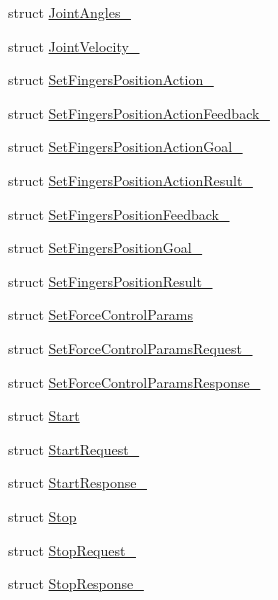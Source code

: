 \begin{DoxyCompactItemize}
struct \hyperlink{structjaco__msgs_1_1JointAngles__}{Joint\+Angles\+\_\+}
\item 
struct \hyperlink{structjaco__msgs_1_1JointVelocity__}{Joint\+Velocity\+\_\+}
\item 
struct \hyperlink{structjaco__msgs_1_1SetFingersPositionAction__}{Set\+Fingers\+Position\+Action\+\_\+}
\item 
struct \hyperlink{structjaco__msgs_1_1SetFingersPositionActionFeedback__}{Set\+Fingers\+Position\+Action\+Feedback\+\_\+}
\item 
struct \hyperlink{structjaco__msgs_1_1SetFingersPositionActionGoal__}{Set\+Fingers\+Position\+Action\+Goal\+\_\+}
\item 
struct \hyperlink{structjaco__msgs_1_1SetFingersPositionActionResult__}{Set\+Fingers\+Position\+Action\+Result\+\_\+}
\item 
struct \hyperlink{structjaco__msgs_1_1SetFingersPositionFeedback__}{Set\+Fingers\+Position\+Feedback\+\_\+}
\item 
struct \hyperlink{structjaco__msgs_1_1SetFingersPositionGoal__}{Set\+Fingers\+Position\+Goal\+\_\+}
\item 
struct \hyperlink{structjaco__msgs_1_1SetFingersPositionResult__}{Set\+Fingers\+Position\+Result\+\_\+}
\item 
struct \hyperlink{namespacejaco__msgs_df/d4f/structjaco__msgs_1_1SetForceControlParams}{Set\+Force\+Control\+Params}
\item 
struct \hyperlink{structjaco__msgs_1_1SetForceControlParamsRequest__}{Set\+Force\+Control\+Params\+Request\+\_\+}
\item 
struct \hyperlink{structjaco__msgs_1_1SetForceControlParamsResponse__}{Set\+Force\+Control\+Params\+Response\+\_\+}
\item 
struct \hyperlink{namespacejaco__msgs_d8/d46/structjaco__msgs_1_1Start}{Start}
\item 
struct \hyperlink{structjaco__msgs_1_1StartRequest__}{Start\+Request\+\_\+}
\item 
struct \hyperlink{structjaco__msgs_1_1StartResponse__}{Start\+Response\+\_\+}
\item 
struct \hyperlink{namespacejaco__msgs_df/d54/structjaco__msgs_1_1Stop}{Stop}
\item 
struct \hyperlink{structjaco__msgs_1_1StopRequest__}{Stop\+Request\+\_\+}
\item 
struct \hyperlink{structjaco__msgs_1_1StopResponse__}{Stop\+Response\+\_\+}
\end{DoxyCompactItemize}
